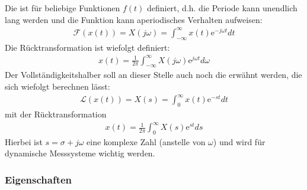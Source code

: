 \documentclass[letterpaper,10pt,english]{jupyterBook}
\begin{document}
\sphinxAtStartPar
Die  ist für beliebige Funktionen \(f(t)\) definiert, d.h. die Periode kann unendlich lang werden und die Funktion kann aperiodisches Verhalten aufweisen:
\begin{equation*}
\begin{split}\mathcal F(x(t)) = X(j\omega) = \int_{-\infty}^{\infty} x(t) \mathrm e^{-j \omega t} dt\end{split}
\end{equation*}
\sphinxAtStartPar
Die Rücktransformation ist wiefolgt definiert:
\begin{equation*}
\begin{split}x(t) = \frac{1}{2\pi}\int_{-\infty}^{\infty} X(j\omega) \mathrm e^{j \omega t} d\omega\end{split}
\end{equation*}
\sphinxAtStartPar
Der Vollständigkeitshalber soll an dieser Stelle auch noch die  erwähnt werden, die sich wiefolgt berechnen lässt:
\begin{equation*}
\begin{split}\mathcal L(x(t)) = X(s) = \int_{0}^{\infty} x(t) \mathrm e^{-st} dt\end{split}
\end{equation*}
\sphinxAtStartPar
mit der Rücktransformation
\begin{equation*}
\begin{split}x(t) = \frac{1}{2\pi}\int_{0}^{\infty} X(s) \mathrm e^{st} ds\end{split}
\end{equation*}
\sphinxAtStartPar
Hierbei ist \(s= \sigma + j\omega\) eine komplexe Zahl (anstelle von \(\omega\)) und wird für dynamische Messsysteme wichtig werden.


\subsubsection{Eigenschaften}
\label{\detokenize{content/3_FourierAnalyse:eigenschaften}}
\sphinxAtStartPar
\end{document}
